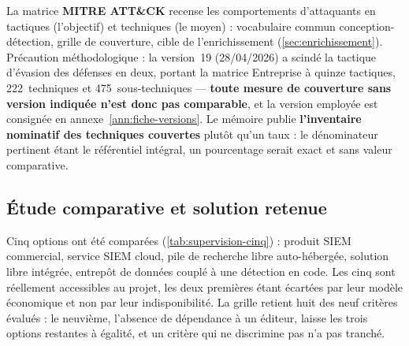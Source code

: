 La matrice \textbf{MITRE ATT\&CK} \cite{mitre_attack,mitre_attack_design2018} recense les
comportements d'attaquants en tactiques (l'objectif) et techniques (le moyen) : vocabulaire commun
conception-détection, grille de couverture, cible de l'enrichissement
(\cref{sec:enrichissement}). Précaution méthodologique : la version~19 (28/04/2026) a scindé
la tactique d'évasion des défenses en deux, portant la matrice Entreprise à quinze tactiques,
222~techniques et 475~sous-techniques --- \textbf{toute mesure de couverture sans version indiquée
n'est donc pas comparable}, et la version employée est consignée en
annexe~\ref{ann:fiche-versions}. Le mémoire publie \textbf{l'inventaire nominatif des techniques
couvertes} plutôt qu'un taux : le dénominateur pertinent étant le référentiel intégral, un
pourcentage serait exact et sans valeur comparative.

\subsection{Étude comparative et solution retenue}
\label{sec:supervision-comparatif}

Cinq options ont été comparées (\cref{tab:supervision-cinq}) : produit SIEM commercial, service
SIEM cloud, pile de recherche libre auto-hébergée, solution libre intégrée, entrepôt de données
couplé à une détection en code. Les cinq sont réellement accessibles au projet, les deux premières
étant écartées par leur modèle économique et non par leur indisponibilité. La grille retient huit
des neuf critères évalués : le neuvième, l'absence de dépendance à un éditeur, laisse les trois
options restantes à égalité, et un critère qui ne discrimine pas n'a pas tranché.


